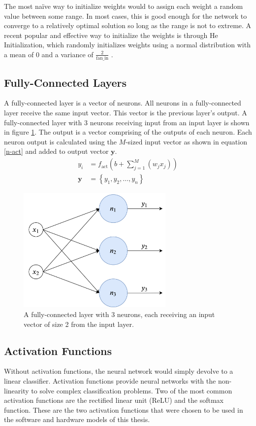 The most na\"ive way to initialize weights would to assign each weight a random value between some range. In most cases, this is good enough for the network to converge to a relatively optimal solution so long as the range is not to extreme. A recent popular and effective way to initialize the weights is through He Initialization, which randomly initializes weights using a normal distribution with a mean of 0 and a variance of $\frac{2}{\text{fan\_in}}$ \cite{HeZR015}. 


\subsection{Fully-Connected Layers}
A fully-connected layer is a vector of neurons. All neurons in a fully-connected layer receive the same input vector. This vector is the previous layer's output. A fully-connected layer with 3 neurons receiving input from an input layer is shown in figure \ref{fully-connected}. The output is a vector comprising of the outputs of each neuron. Each neuron output is calculated using the $M$-sized input vector as shown in equation \ref{n-act} and added to output vector $\mathbf{y}$.
\begin{align}
y_i &= f_{\text{act}}\left( b + \sum_{j=1}^{M}(w_jx_j) \right) \label{n-act} \\
\mathbf{y} &= \left\{ y_1, y_2, \ldots, y_n \right\} 
\end{align}

\begin{figure}
	\centering
	\includegraphics[width=3in]{figures/fully-connected}
	\caption{A fully-connected layer with 3 neurons, each receiving an input vector of size 2 from the input layer.}\label{fully-connected}
\end{figure}

\subsection{Activation Functions}
Without activation functions, the neural network would simply devolve to a linear classifier. Activation functions provide neural networks with the non-linearity to solve complex classification problems. Two of the most common activation functions are the rectified linear unit (ReLU) and the softmax function. These are the two activation functions that were chosen to be used in the software and hardware models of this thesis.

